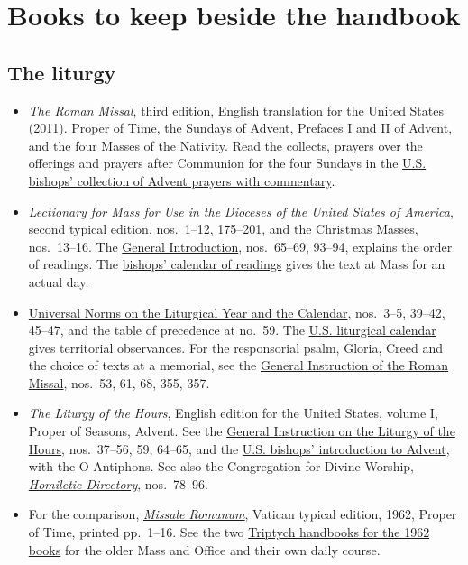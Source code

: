 \section{Books to keep beside the handbook}

\subsection{The liturgy}

\begin{itemize}
\item \emph{The Roman Missal}, third edition, English translation for the United States (2011). Proper of Time, the Sundays of Advent, Prefaces I and II of Advent, and the four Masses of the Nativity. Read the collects, prayers over the offerings and prayers after Communion for the four Sundays in the \href{https://www.usccb.org/prayer-and-worship/liturgical-year-and-calendar/advent/commentary-on-advent-proper-prayers}{U.S. bishops' collection of Advent prayers with commentary}.
\item \emph{Lectionary for Mass for Use in the Dioceses of the United States of America}, second typical edition, nos.~1--12, 175--201, and the Christmas Masses, nos.~13--16. The \href{https://www.liturgyoffice.org.uk/Resources/GIRM/Documents/Lectionary.pdf}{General Introduction}, nos.~65--69, 93--94, explains the order of readings. The \href{https://bible.usccb.org/readings/calendar}{bishops' calendar of readings} gives the text at Mass for an actual day.
\item \href{https://www.liturgyoffice.org.uk/Resources/GIRM/Documents/GNLY.pdf}{Universal Norms on the Liturgical Year and the Calendar}, nos.~3--5, 39--42, 45--47, and the table of precedence at no.~59. The \href{https://www.usccb.org/prayer-worship/liturgical-year}{U.S. liturgical calendar} gives territorial observances. For the responsorial psalm, Gloria, Creed and the choice of texts at a memorial, see the \href{https://www.usccb.org/prayer-and-worship/the-mass/general-instruction-of-the-roman-missal}{General Instruction of the Roman Missal}, nos.~53, 61, 68, 355, 357.
\item \emph{The Liturgy of the Hours}, English edition for the United States, volume I, Proper of Seasons, Advent. See the \href{https://www.liturgyoffice.org.uk/Resources/Rites/GILH.pdf}{General Instruction on the Liturgy of the Hours}, nos.~37--56, 59, 64--65, and the \href{https://www.usccb.org/prayer-worship/liturgical-year/advent}{U.S. bishops' introduction to Advent}, with the O Antiphons. See also the Congregation for Divine Worship, \href{https://www.usccb.org/resources/Homiletic-Directory-CDWDS.pdf}{\emph{Homiletic Directory}}, nos.~78--96.
\item For the comparison, \href{https://media.churchmusicassociation.org/pdf/missale62.pdf}{\emph{Missale Romanum}}, Vatican typical edition, 1962, Proper of Time, printed pp.~1--16. See the two \href{https://mystago.gy/library/traditional-latin-mass.html#seasonal-handbooks}{Triptych handbooks for the 1962 books} for the older Mass and Office and their own daily course.
\end{itemize}

